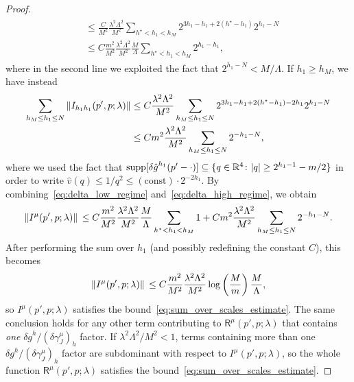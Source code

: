 \documentclass[a4paper, 11pt]{article}
\newcommand{\R}{\mathbb{R}}
\newcommand{\cutoff}{\Lambda}								%
\newcommand{\sing}[2]{{#1}^{#2}}							%
\theoremstyle{thm}
\begin{document}
\begin{proof}
\begin{align}
\begin{split}
& \le \frac{C}{M^2} \frac{\lambda^2 \cutoff^2}{M^2} \sum_{h^\star < h_1 < h_M} 2^{3h_1 - h_1 + 2(h^\star - h_1)} 2^{h_1 - N} \\
& \le C \frac{m^2}{M^2} \frac{\lambda^2 \cutoff^2}{M^2} \frac{M}{\cutoff} \sum_{h^\star < h_1 < h_M} 2^{h_1 - h_1},
\end{split}
\end{align}
where in the second line we exploited the fact that $2^{h_1 - N} < M/\cutoff$. If $h_1 \ge h_M$, we have instead
\begin{align}
\label{eq:delta_high_regime}
\begin{split}
\sum_{h_M \le h_1 \le N} \norm{I_{h_1 h_1}(p', p; \lambda)}
& \le C \frac{\lambda^2 \cutoff^2}{M^2} \sum_{h_M \le h_1 \le N} 2^{3h_1 - h_1 + 2(h^\star - h_1) - 2h_1} 2^{h_1 - N} \\
& \le C m^2 \frac{\lambda^2 \cutoff^2}{M^2} \sum_{h_M \le h_1 \le N} 2^{-h_1-N},
\end{split}
\end{align}
where we used the fact that $\mathrm{supp} [\sing{\delta \hat{g}}{h_1}(p' - \cdot)] \subseteq \lbrace q \in \R^4 \colon \abs{q} \ge 2^{h_1-1} - m/2 \rbrace$ in order to write $\hat{v}(q) \le 1/q^2 \le (\mathrm{const}) \cdot 2^{-2h_1}$. By combining~\eqref{eq:delta_low_regime} and~\eqref{eq:delta_high_regime}, we obtain
\begin{equation}
\label{eq:regimes_combined}
\norm*{I^\mu(p', p; \lambda)} \le C \frac{m^2}{M^2} \frac{\lambda^2 \cutoff^2}{M^2}\frac{M}{\cutoff} \sum_{h^\star < h_1 < h_M} 1 + C m^2 \frac{\lambda^2 \cutoff^2}{M^2} \sum_{h_M \le h_1 \le N} 2^{-h_1-N}.
\end{equation}
After performing the sum over $h_1$ (and possibly redefining the constant $C$), this becomes
\begin{equation}
\norm*{I^\mu(p', p; \lambda)} \le C \frac{m^2}{M^2} \frac{\lambda^2 \cutoff^2}{M^2} \log \left( \frac{M}{m} \right) \frac{M}{\cutoff},
\end{equation}
so $I^\mu(p', p; \lambda)$ satisfies the bound~\eqref{eq:sum_over_scales_estimate}. The same conclusion holds for any other term contributing to $\mathsf{R}^\mu(p', p; \lambda)$ that contains \emph{one} $\sing{\delta g}{h}/(\delta \gamma^\mu_J)_h$ factor. If $\lambda^2 \cutoff^2/M^2 < 1$, terms containing more than one $\sing{\delta g}{h}/(\delta \gamma^\mu_J)_h$ factor are subdominant with respect to $I^\mu(p', p; \lambda)$, so the whole function $\mathsf{R}^\mu(p', p; \lambda)$ satisfies the bound~\eqref{eq:sum_over_scales_estimate}.
\end{proof}
\end{document}
